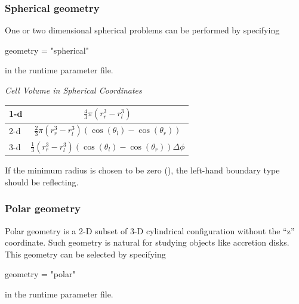 \subsubsection{Spherical geometry}

One or two dimensional spherical problems can be performed by
specifying
\begin{codeseg}
   geometry = "spherical"
\end{codeseg}
in the runtime parameter file.




\vspace{1cm}
\begin{minipage}{6in}
\renewcommand{\arraystretch}{1.5}
\begin{center}
{\it Cell Volume in Spherical Coordinates}%
\begin{tabular}{|l|c|}
\hline
1-d & $\frac{4}{3} \pi (r_r^3 - r_l^3)$ \\
\hline
2-d & $\frac{2}{3} \pi (r_r^3 - r_l^3) (\cos(\theta_l) - \cos(\theta_r))$ \\
\hline
3-d & $\frac{1}{3} (r_r^3 - r_l^3) (\cos(\theta_l) - \cos(\theta_r))
      \Delta \phi$ \\
\hline
\end{tabular}
\end{center}
\end{minipage}

\vspace{1cm}



If the minimum radius is chosen to be zero
(), the left-hand boundary type should be reflecting.

\subsubsection{Polar geometry}
Polar geometry is a 2-D subset of 3-D cylindrical configuration
without the ``z'' coordinate. Such geometry is natural for studying
objects like accretion disks. This geometry can be selected by
specifying
\begin{codeseg}
   geometry = "polar"
\end{codeseg}
in the runtime parameter file.


